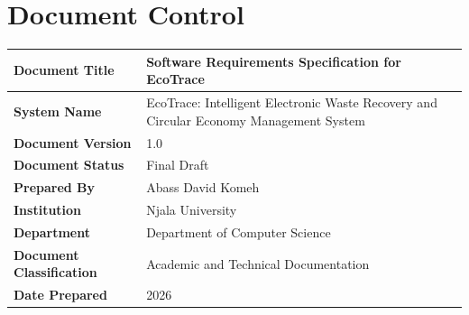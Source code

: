 
\chapter*{Document Control}

\begin{table}[H]
\centering

\begin{tabularx}{\textwidth}{
    |p{5cm}|
    X|
}

\hline
\textbf{Document Title} &
Software Requirements Specification for EcoTrace \\

\hline
\textbf{System Name} &
EcoTrace: Intelligent Electronic Waste Recovery and
Circular Economy Management System \\

\hline
\textbf{Document Version} &
1.0 \\

\hline
\textbf{Document Status} &
Final Draft \\

\hline
\textbf{Prepared By} &
Abass David Komeh \\

\hline
\textbf{Institution} &
Njala University \\

\hline
\textbf{Department} &
Department of Computer Science \\

\hline
\textbf{Document Classification} &
Academic and Technical Documentation \\

\hline
\textbf{Date Prepared} &
2026 \\

\hline

\end{tabularx}
\end{table}